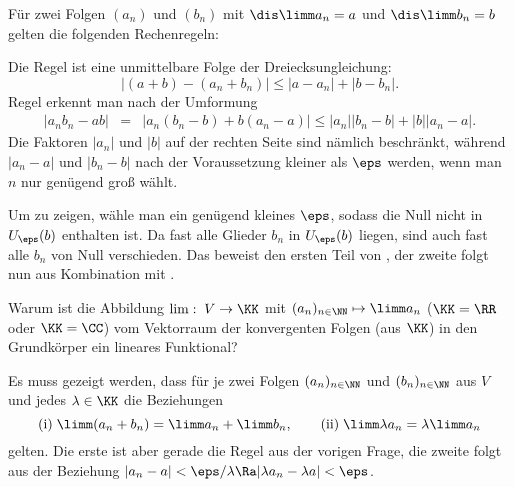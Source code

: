 \begin{antwort}
  Für zwei Folgen $(a_n)$ und $(b_n)$ mit $\dis\limm a_n = a$ und 
  $\dis \limm b_n = b$ gelten die folgenden Rechenregeln:

  \medskip\noindent
  Die Regel  ist eine unmittelbare Folge der Dreiecksungleichung: 
  \[
  \big|(a+b)-(a_n+b_n)\big| \le \big|a-a_n\big|+\big|b-b_n\big|.
  \]
  Regel  erkennt man nach der Umformung
  \begin{eqnarray*}
    \big|a_nb_n-ab\big| &=& \big|a_n(b_n-b)+b(a_n-a)\big| 
    \le \big|a_n\big|\big|b_n-b\big|+\big|b\big|\big|a_n-a\big|.
  \end{eqnarray*} 
  Die Faktoren $|a_n|$ und $|b|$ auf der rechten Seite
  sind nämlich beschränkt, 
  während $|a_n-a|$ und $|b_n-b|$ nach der Voraussetzung kleiner als $\eps$  
  werden, wenn man $n$ nur genügend groß wählt. 

  Um  zu zeigen, wähle man ein genügend kleines 
  $\eps$, sodass die Null nicht in $U_\eps(b)$ enthalten ist. Da fast 
  alle Glieder $b_n$ in $U_\eps(b)$ liegen, sind auch fast alle $b_n$ von 
  Null verschieden. Das beweist den ersten Teil von , der zweite folgt 
  nun aus Kombination mit . \AntEnd
\end{antwort}

\begin{frage}%
  \label{02_flin}
  Warum ist die Abbildung 
  $\lim: \; V\to \KK$ 
  mit $(a_n)_{n\in\NN} \mapsto \limm a_n$  
  ($\KK=\RR$ oder $\KK=\CC$)  
  vom Vektorraum der konvergenten Folgen (aus $\KK$) in den 
  Grundkörper ein lineares Funktional?
\end{frage}

\begin{antwort}
  Es muss gezeigt werden, dass für je zwei Folgen 
  $(a_n)_{n\in\NN}$ und $(b_n)_{n\in\NN}$ aus $V$ und jedes $\lambda \in \KK$ die Beziehungen 
  \[
  \mathrm{(i)}\;\limm (a_n+b_n) = \limm a_n + \limm b_n, 
  \qquad
  \mathrm{(ii)}\;\limm \lambda a_n = \lambda \limm a_n 
  \]
  gelten. Die erste ist aber gerade die Regel  aus der vorigen 
  Frage, die zweite folgt aus der Beziehung 
  $|a_n-a|<\eps/\lambda \Ra |\lambda a_n - \lambda a| < \eps$.   
  \AntEnd
\end{antwort}

